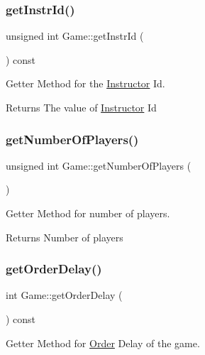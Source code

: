 \subsubsection{\texorpdfstring{get\+Instr\+Id()}{getInstrId()}}
{\footnotesize\ttfamily unsigned int Game\+::get\+Instr\+Id (\begin{DoxyParamCaption}{ }\end{DoxyParamCaption}) const}



Getter Method for the \hyperlink{classInstructor}{Instructor} Id. 

\begin{DoxyReturn}{Returns}
The value of \hyperlink{classInstructor}{Instructor} Id 
\end{DoxyReturn}
\mbox{\label{classGame_a6118afd4e0300b2e855e42fb8400411c}} 
\subsubsection{\texorpdfstring{get\+Number\+Of\+Players()}{getNumberOfPlayers()}}
{\footnotesize\ttfamily unsigned int Game\+::get\+Number\+Of\+Players (\begin{DoxyParamCaption}{ }\end{DoxyParamCaption})}



Getter Method for number of players. 

\begin{DoxyReturn}{Returns}
Number of players 
\end{DoxyReturn}
\mbox{\label{classGame_ab68ef87715311bea275bdac17342f2bd}} 
\subsubsection{\texorpdfstring{get\+Order\+Delay()}{getOrderDelay()}}
{\footnotesize\ttfamily int Game\+::get\+Order\+Delay (\begin{DoxyParamCaption}{ }\end{DoxyParamCaption}) const}



Getter Method for \hyperlink{classOrder}{Order} Delay of the game. 

